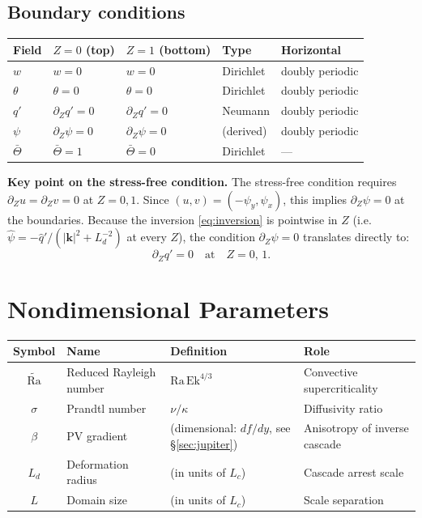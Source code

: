 \documentclass[11pt]{article}
\newcommand{\Rav}{\widetilde{\mathrm{Ra}}}
\newcommand{\Ek}{\mathrm{Ek}}
\newcommand{\Ld}{L_d}
\newcommand{\Lc}{L_c}
\newcommand{\kh}{|\bm{k}|}
\newcommand{\hhat}[1]{\widehat{#1}}
\begin{document}
\subsection{Boundary conditions}
\label{sec:bcs}

\begin{center}
\begin{tabular}{lllll}
\toprule
Field & $Z = 0$ (top) & $Z = 1$ (bottom) & Type & Horizontal \\
\midrule
$w$ & $w = 0$ & $w = 0$ & Dirichlet & doubly periodic \\
$\theta$ & $\theta = 0$ & $\theta = 0$ & Dirichlet & doubly periodic \\
$q'$ & $\partial_Z q' = 0$ & $\partial_Z q' = 0$ & Neumann & doubly periodic \\
$\psi$ & $\partial_Z \psi = 0$ & $\partial_Z \psi = 0$ & (derived) & doubly periodic \\
$\bar\Theta$ & $\bar\Theta = 1$ & $\bar\Theta = 0$ & Dirichlet & --- \\
\bottomrule
\end{tabular}
\end{center}

\noindent\textbf{Key point on the stress-free condition.} The stress-free condition requires $\partial_Z u = \partial_Z v = 0$ at $Z = 0, 1$. Since $(u,v) = (-\psi_y, \psi_x)$, this implies $\partial_Z \psi = 0$ at the boundaries. Because the inversion \eqref{eq:inversion} is pointwise in $Z$ (i.e.\ $\hhat\psi = -\hhat{q}'/(\kh^2 + \Ld^{-2})$ at every $Z$), the condition $\partial_Z \psi = 0$ translates directly to:
\begin{equation}
\partial_Z q' = 0 \quad\text{at}\quad Z = 0,\,1.
\label{eq:neumann_qprime}
\end{equation}



\section{Nondimensional Parameters}
\label{sec:params}

\begin{center}
\begin{tabular}{clll}
\toprule
Symbol & Name & Definition & Role \\
\midrule
$\Rav$ & Reduced Rayleigh number & $\mathrm{Ra}\,\Ek^{4/3}$ & Convective supercriticality \\
$\sigma$ & Prandtl number & $\nu/\kappa$ & Diffusivity ratio \\
$\beta$ & PV gradient & (dimensional: $df/dy$, see \S\ref{sec:jupiter}) & Anisotropy of inverse cascade \\
$\Ld$ & Deformation radius & (in units of $\Lc$) & Cascade arrest scale \\
$L$ & Domain size & (in units of $\Lc$) & Scale separation \\
\bottomrule
\end{tabular}
\end{center}
\end{document}
